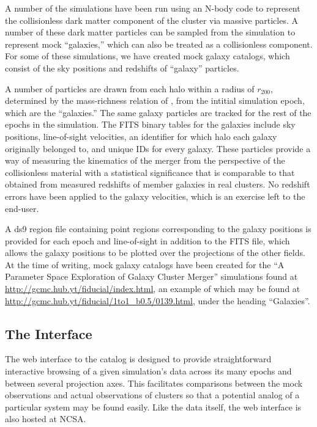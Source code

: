 \documentclass{emulateapj}
\begin{document}
A number of the simulations have been run using an N-body code to represent the collisionless dark matter component of the cluster via massive particles. A number of these dark matter particles can be sampled from the simulation to represent mock ``galaxies,'' which can also be treated as a collisionless component. For some of these simulations, we have created mock galaxy catalogs, which consist of the sky positions and redshifts of ``galaxy'' particles.

A number of particles are drawn from each halo within a radius of $r_{200}$, determined by the mass-richness relation of \citet{for14}, from the intitial simulation epoch, which are the ``galaxies.'' The same galaxy particles are tracked for the rest of the epochs in the simulation. The FITS binary tables for the galaxies include sky positions, line-of-sight velocities, an identifier for which halo each galaxy originally belonged to, and unique IDs for every galaxy. These particles provide a way of measuring the kinematics of the merger from the perspective of the collisionless material with a statistical significance that is comparable to that obtained from measured redshifts of member galaxies in real clusters. No redshift errors have been applied to the galaxy velocities, which is an exercise left to the end-user.

A ds9 region file containing point regions corresponding to the galaxy positions is provided for each epoch and line-of-sight in addition to the FITS file, which allows the galaxy positions to be plotted over the projections of the other fields. At the time of writing, mock galaxy catalogs have been created for the ``A Parameter Space Exploration of Galaxy Cluster Merger'' simulations found at \url{http://gcmc.hub.yt/fiducial/index.html}, an example of which may be found at \url{http://gcmc.hub.yt/fiducial/1to1_b0.5/0139.html}, under the heading ``Galaxies''.

\subsection{The Interface}\label{sec:interface}

The web interface to the catalog is designed to provide straightforward interactive browsing of a given simulation's data across its many epochs and between several projection axes. This facilitates comparisons between the mock observations and actual observations of clusters so that a potential analog of a particular system may be found easily. Like the data itself, the web interface is also hosted at NCSA.
\end{document}
